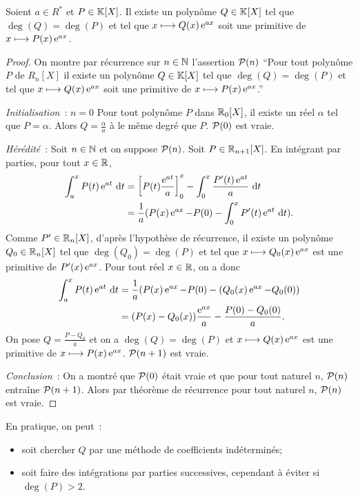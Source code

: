 \begin{prop}
  Soient \(a \in R^*\) et \(P \in \K[X]\). Il existe un polynôme \(Q \in \K[X]\) 
  tel que \(\deg(Q)=\deg(P)\) et tel que \(x \longmapsto Q(x)\e^{ax}\) soit une 
  primitive de \(x \longmapsto P(x)\e^{ax}\).
\end{prop}
\begin{proof}
  On montre par récurrence sur \(n \in \N\) l'assertion \(\P(n)\) ``Pour tout 
  polynôme \(P\) de \(R_n[X]\) il existe un polynôme \(Q \in \K[X]\) tel que 
  \(\deg(Q)=\deg(P)\) et tel que \(x \longmapsto Q(x)\e^{ax}\) soit une 
  primitive de \(x \longmapsto P(x)\e^{ax}\).''

  \emph{Initialisation}~: \(n=0\) Pour tout polynôme \(P\) dans \(\R_0[X]\), il 
  existe un réel \(\alpha\) tel que \(P=\alpha\). Alors \(Q=\frac{\alpha}{a}\) à 
  le même degré que \(P\). \(\P(0)\) est vraie.

  \emph{Hérédité}~: Soit \(n \in \N\) et on suppose \(\P(n)\). Soit \(P \in 
  \R_{n+1}[X]\). En intégrant par parties, pour tout \(x \in \R\),
  \begin{align*}
    \int_a^x P(t)\e^{at}\,\diff t &= \left[P(t)\frac{\e^{at}}{a}\right]_0^x - 
    \int_0^x \frac{P'(t)\e^{at}}{a}\,\diff t \\
    & = \frac{1}{a}(P(x)\e^{ax} -P(0) - \int_0^x P'(t)\e^{at}\,\diff t ).
  \end{align*}
  Comme \(P'\in\R_n[X]\), d'après l'hypothèse de récurrence, il existe un 
  polynôme \(Q_0 \in \R_n[X]\) tel que \(\deg(Q_0)=\deg(P)\) et tel que \(x 
  \longmapsto Q_0(x)\e^{ax}\) est une primitive de \(P'(x)\e^{ax}\). Pour tout 
  réel \(x \in \R\), on a donc
  \begin{align*}
    \int_a^x P(t)\e^{at}\,\diff t &= \frac{1}{a}(P(x)\e^{ax} -P(0) - 
    (Q_0(x)\e^{ax}-Q_0(0))\\
    &=(P(x)-Q_0(x))\frac{\e^{ax}}{a} - \frac{P(0)-Q_0(0)}{a}.
  \end{align*}
  On pose \(Q = \frac{P-Q_0}{a}\) et on a \(\deg(Q)=\deg(P)\) et \(x\longmapsto 
  Q(x)\e^{ax}\) est une primitive de \(x\longmapsto P(x)\e^{ax}\). \(\P(n+1)\) 
  est vraie.

  \emph{Conclusion}~: On a montré que \(\P(0)\) était vraie et que pour tout 
  naturel \(n\), \(\P(n)\) entraîne \(\P(n+1)\). Alors par théorème de 
  récurrence pour tout naturel \(n\), \(\P(n)\) est vraie.
\end{proof}

En pratique, on peut~:
\begin{itemize}
  \item soit chercher \(Q\) par une méthode de coefficients indéterminés;
  \item soit faire des intégrations par parties successives, cependant à éviter 
    si \(\deg(P) >2\).
\end{itemize}

